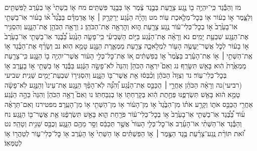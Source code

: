 \documentclass[twoside, openany, parskip=half, 11pt]{book}
\begin{document}
מז וְהַבֶּ֕גֶד כִּֽי־יִהְיֶ֥ה ב֖וֹ נֶ֣גַע צָרָ֑עַת בְּבֶ֣גֶד צֶ֔מֶר א֖וֹ בְּבֶ֥גֶד פִּשְׁתִּֽים׃ מח א֤וֹ בִֽשְׁתִי֙ א֣וֹ בְעֵ֔רֶב לַפִּשְׁתִּ֖ים וְלַצָּ֑מֶר א֣וֹ בְע֔וֹר א֖וֹ בְּכׇל־מְלֶ֥אכֶת עֽוֹר׃ מט וְהָיָ֨ה הַנֶּ֜גַע יְרַקְרַ֣ק ׀ א֣וֹ אֲדַמְדָּ֗ם בַּבֶּ֩גֶד֩ א֨וֹ בָע֜וֹר אֽוֹ־בַשְּׁתִ֤י אוֹ־בָעֵ֙רֶב֙ א֣וֹ בְכׇל־כְּלִי־ע֔וֹר נֶ֥גַע צָרַ֖עַת ה֑וּא וְהׇרְאָ֖ה אֶת־הַכֹּהֵֽן׃ נ וְרָאָ֥ה הַכֹּהֵ֖ן אֶת־הַנָּ֑גַע וְהִסְגִּ֥יר אֶת־הַנֶּ֖גַע שִׁבְעַ֥ת יָמִֽים׃ נא וְרָאָ֨ה אֶת־הַנֶּ֜גַע בַּיּ֣וֹם הַשְּׁבִיעִ֗י כִּֽי־פָשָׂ֤ה הַנֶּ֙גַע֙ בַּ֠בֶּ֠גֶד אֽוֹ־בַשְּׁתִ֤י אֽוֹ־בָעֵ֙רֶב֙ א֣וֹ בָע֔וֹר לְכֹ֛ל אֲשֶׁר־יֵעָשֶׂ֥ה הָע֖וֹר לִמְלָאכָ֑ה צָרַ֧עַת מַמְאֶ֛רֶת הַנֶּ֖גַע טָמֵ֥א הֽוּא׃ נב וְשָׂרַ֨ף אֶת־הַבֶּ֜גֶד א֥וֹ אֶֽת־הַשְּׁתִ֣י ׀ א֣וֹ אֶת־הָעֵ֗רֶב בַּצֶּ֙מֶר֙ א֣וֹ בַפִּשְׁתִּ֔ים א֚וֹ אֶת־כׇּל־כְּלִ֣י הָע֔וֹר אֲשֶׁר־יִהְיֶ֥ה ב֖וֹ הַנָּ֑גַע כִּֽי־צָרַ֤עַת מַמְאֶ֙רֶת֙ הִ֔וא בָּאֵ֖שׁ תִּשָּׂרֵֽף׃ נג וְאִם֮ יִרְאֶ֣ה הַכֹּהֵן֒ וְהִנֵּה֙ לֹא־פָשָׂ֣ה הַנֶּ֔גַע בַּבֶּ֕גֶד א֥וֹ בַשְּׁתִ֖י א֣וֹ בָעֵ֑רֶב א֖וֹ בְּכׇל־כְּלִי־עֽוֹר׃ נד וְצִוָּה֙ הַכֹּהֵ֔ן וְכִ֨בְּס֔וּ אֵ֥ת אֲשֶׁר־בּ֖וֹ הַנָּ֑גַע וְהִסְגִּיר֥וֹ שִׁבְעַת־יָמִ֖ים שֵׁנִֽית׃ שביעי (רביעי)נה וְרָאָ֨ה הַכֹּהֵ֜ן אַחֲרֵ֣י ׀ הֻכַּבֵּ֣ס אֶת־הַנֶּ֗גַע וְ֠הִנֵּ֠ה לֹֽא־הָפַ֨ךְ הַנֶּ֤גַע אֶת־עֵינוֹ֙ וְהַנֶּ֣גַע לֹֽא־פָשָׂ֔ה טָמֵ֣א ה֔וּא בָּאֵ֖שׁ תִּשְׂרְפֶ֑נּוּ פְּחֶ֣תֶת הִ֔וא בְּקָרַחְתּ֖וֹ א֥וֹ בְגַבַּחְתּֽוֹ׃ נו וְאִם֮ רָאָ֣ה הַכֹּהֵן֒ וְהִנֵּה֙ כֵּהָ֣ה הַנֶּ֔גַע אַחֲרֵ֖י הֻכַּבֵּ֣ס אֹת֑וֹ וְקָרַ֣ע אֹת֗וֹ מִן־הַבֶּ֙גֶד֙ א֣וֹ מִן־הָע֔וֹר א֥וֹ מִן־הַשְּׁתִ֖י א֥וֹ מִן־הָעֵֽרֶב׃ מפטירנז וְאִם־תֵּרָאֶ֨ה ע֜וֹד בַּ֠בֶּ֠גֶד אֽוֹ־בַשְּׁתִ֤י אֽוֹ־בָעֵ֙רֶב֙ א֣וֹ בְכׇל־כְּלִי־ע֔וֹר פֹּרַ֖חַת הִ֑וא בָּאֵ֣שׁ תִּשְׂרְפֶ֔נּוּ אֵ֥ת אֲשֶׁר־בּ֖וֹ הַנָּֽגַע׃ נח וְהַבֶּ֡גֶד אֽוֹ־הַשְּׁתִ֨י אוֹ־הָעֵ֜רֶב אֽוֹ־כׇל־כְּלִ֤י הָעוֹר֙ אֲשֶׁ֣ר תְּכַבֵּ֔ס וְסָ֥ר מֵהֶ֖ם הַנָּ֑גַע וְכֻבַּ֥ס שֵׁנִ֖ית וְטָהֵֽר׃ נט זֹ֠את תּוֹרַ֨ת נֶֽגַע־צָרַ֜עַת בֶּ֥גֶד הַצֶּ֣מֶר ׀ א֣וֹ הַפִּשְׁתִּ֗ים א֤וֹ הַשְּׁתִי֙ א֣וֹ הָעֵ֔רֶב א֖וֹ כׇּל־כְּלִי־ע֑וֹר לְטַהֲר֖וֹ א֥וֹ לְטַמְּאֽוֹ׃
\end{document}
